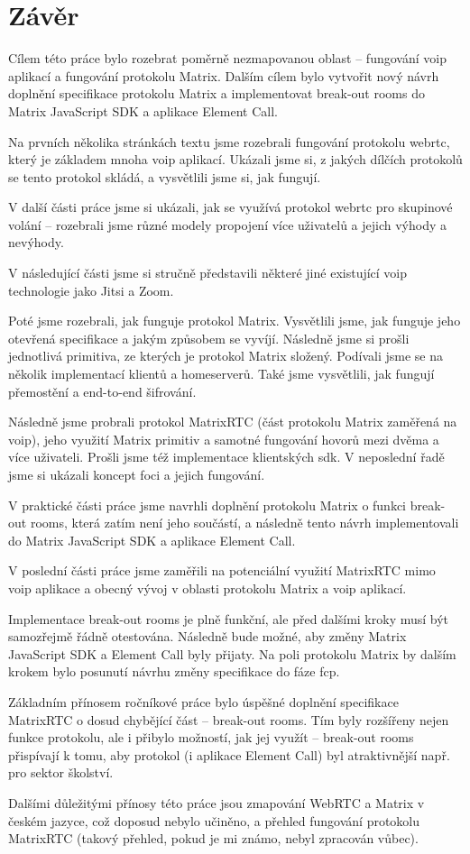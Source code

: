 \section{Závěr}

Cílem této práce bylo rozebrat poměrně nezmapovanou oblast -- fungování
\gls{voip} aplikací a fungování protokolu Matrix. Dalším cílem bylo vytvořit
nový návrh doplnění specifikace protokolu Matrix a implementovat break-out rooms
do Matrix JavaScript SDK a aplikace Element Call.

Na prvních několika stránkách textu jsme rozebrali fungování protokolu
\gls{webrtc}, který je základem mnoha \gls{voip} aplikací. Ukázali jsme si, z
jakých dílčích protokolů se tento protokol skládá, a vysvětlili jsme si, jak
fungují.

V další části práce jsme si ukázali, jak se využívá protokol \gls{webrtc} pro
skupinové volání -- rozebrali jsme různé modely propojení více uživatelů a
jejich výhody a nevýhody.

V následující části jsme si stručně představili některé jiné existující
\gls{voip} technologie jako Jitsi a Zoom.

Poté jsme rozebrali, jak funguje protokol Matrix. Vysvětlili jsme, jak funguje
jeho otevřená specifikace a jakým způsobem se vyvíjí. Následně jsme si prošli
jednotlivá primitiva, ze kterých je protokol Matrix složený. Podívali jsme se na
několik implementací klientů a homeserverů. Také jsme vysvětlili, jak fungují
přemostění a end-to-end šifrování.

Následně jsme probrali protokol MatrixRTC (část protokolu Matrix zaměřená na
\gls{voip}), jeho využití Matrix primitiv a samotné fungování hovorů mezi dvěma
a více uživateli. Prošli jsme též implementace klientských \gls{sdk}. V
neposlední řadě jsme si ukázali koncept foci a jejich fungování.

V praktické části práce jsme navrhli doplnění protokolu Matrix o funkci
break-out rooms, která zatím není jeho součástí, a následně tento návrh
implementovali do Matrix JavaScript SDK a aplikace Element Call.

V poslední části práce jsme zaměřili na potenciální využití MatrixRTC mimo
\gls{voip} aplikace a obecný vývoj v oblasti protokolu Matrix a \gls{voip}
aplikací.

Implementace break-out rooms je plně funkční, ale před dalšími kroky musí být
samozřejmě řádně otestována. Následně bude možné, aby změny Matrix JavaScript
SDK a Element Call byly přijaty. Na poli protokolu Matrix by dalším krokem bylo
posunutí návrhu změny specifikace do fáze \gls{fcp}.

Základním přínosem ročníkové práce bylo úspěšné doplnění specifikace MatrixRTC o
dosud chybějící část -- break-out rooms. Tím byly rozšířeny nejen funkce
protokolu, ale i přibylo možností, jak jej využít -- break-out rooms přispívají
k tomu, aby protokol (i aplikace Element Call) byl atraktivnější např. pro
sektor školství.

Dalšími důležitými přínosy této práce jsou zmapování WebRTC a Matrix v českém
jazyce, což doposud nebylo učiněno, a přehled fungování protokolu MatrixRTC
(takový přehled, pokud je mi známo, nebyl zpracován vůbec).
